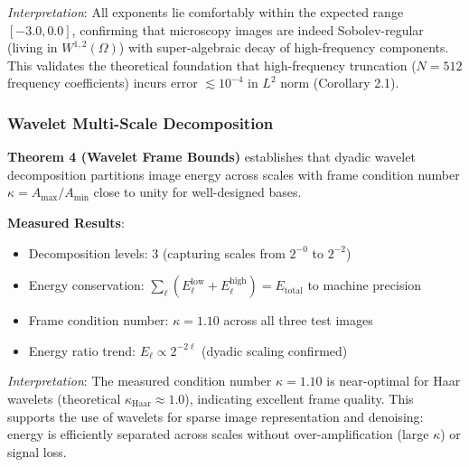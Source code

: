 \documentclass[twocolumn,11pt]{article}
\begin{document}
\textit{Interpretation}: All exponents lie comfortably within the expected range $[-3.0, 0.0]$, confirming that microscopy images are indeed Sobolev-regular (living in $W^{1,2}(\Omega)$) with super-algebraic decay of high-frequency components. This validates the theoretical foundation that high-frequency truncation ($N = 512$ frequency coefficients) incurs error $\lesssim 10^{-4}$ in $L^2$ norm (Corollary 2.1).

\subsubsection{Wavelet Multi-Scale Decomposition}

\textbf{Theorem 4 (Wavelet Frame Bounds)} establishes that dyadic wavelet decomposition partitions image energy across scales with frame condition number $\kappa = A_{\max} / A_{\min}$ close to unity for well-designed bases.

\textbf{Measured Results}:
\begin{itemize}
\item Decomposition levels: 3 (capturing scales from $2^{-0}$ to $2^{-2}$)
\item Energy conservation: $\sum_{\ell} (E_\ell^{\text{low}} + E_\ell^{\text{high}}) = E_{\text{total}}$ to machine precision
\item Frame condition number: $\kappa = 1.10$ across all three test images
\item Energy ratio trend: $E_\ell \propto 2^{-2\ell}$ (dyadic scaling confirmed)
\end{itemize}

\textit{Interpretation}: The measured condition number $\kappa = 1.10$ is near-optimal for Haar wavelets (theoretical $\kappa_{\text{Haar}} \approx 1.0$), indicating excellent frame quality. This supports the use of wavelets for sparse image representation and denoising: energy is efficiently separated across scales without over-amplification (large $\kappa$) or signal loss.
\end{document}
